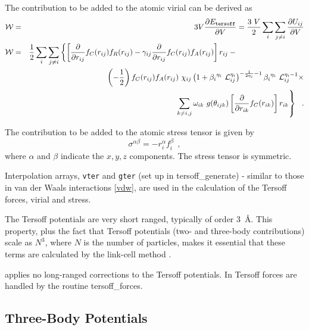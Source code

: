 The contribution to be added to the atomic virial can be derived
as
\begin{eqnarray}
{\cal W} &=& 3V \frac{\partial E_{\tt tersoff}}{\partial V} =
\frac{3~V}{2} \sum_{i} \sum_{j \neq i} \frac{\partial U_{ij}}{\partial V} \\
{\cal W} &=& \frac{1}{2} \sum_{i} \sum_{j \neq i} \left\{ \left[
\frac{\partial}{\partial r_{ij}} f_{C}(r_{ij}) f_{R}(r_{ij}) -
\gamma_{ij} \frac{\partial}{\partial r_{ij}} f_{C}(r_{ij}) f_{A}(r_{ij}) \right] r_{ij} - \phantom{xxxxxxxxxxxxxxx} \right. \nonumber \\
& & \phantom{xxxxxxxx} \left( -\frac{1}{2} \right) f_{C}(r_{ij}) f_{A}(r_{ij})~\chi_{ij}
\left( 1 + {\beta_{i}}^{\eta_{i}}~{\cal{L}}_{ij}^{\eta_{i}} \right)^{-\frac{1}{2 \eta_{i}} - 1}
{\beta_{i}}^{\eta_{i}}~{\cal{L}}_{ij}^{\eta_{i}-1} \times \\
& & \phantom{xxxxxxxx} \left. \sum_{k \neq i,j} \omega_{ik}~g(\theta_{ijk}) \left[
\frac{\partial}{\partial r_{ik}} f_{C}(r_{ik}) \right] r_{ik} \right\} ~~.
\nonumber
\end{eqnarray}

The contribution to be added to the atomic stress
tensor is given by
\begin{equation}
\sigma^{\alpha \beta} = -r_{i}^{\alpha} f_{i}^{\beta}~~,
\end{equation}
where $\alpha$ and $\beta$ indicate the $x,y,z$ components.  The
stress tensor is symmetric.

Interpolation arrays, {\tt vter} and {\tt gter} (set up in
{\sc tersoff\_generate}) - similar to those in van der Waals
interactions \ref{vdw}, are used in the calculation of the Tersoff
forces, virial and stress.

The Tersoff potentials are very short
ranged, typically of order $3$~\AA.  This property, plus the fact
that Tersoff potentials (two- and
three-body contributions) scale as $N^{3}$, where $N$ is the number
of particles, makes it essential that these terms are calculated by
the link-cell method \cite{eastwood-80a}.

\D applies no long-ranged corrections to the
Tersoff potentials.  In \D Tersoff forces
are handled by the routine {\sc tersoff\_forces}.

\subsection{Three-Body Potentials}
\label{three-body}

